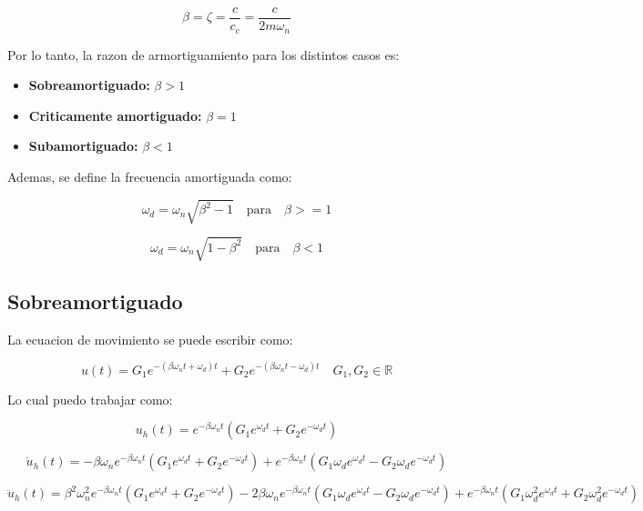 \documentclass{article}  %
\begin{document}
\begin{equation}
    \beta = \zeta = \frac{c}{c_c} = \frac{c}{2m\omega_n}
\end{equation}

Por lo tanto, la razon de armortiguamiento para los distintos casos es:

\begin{itemize}
    \item \textbf{Sobreamortiguado:} $\beta > 1$
    \item \textbf{Criticamente amortiguado:} $\beta = 1$
    \item \textbf{Subamortiguado:} $\beta < 1$
\end{itemize}

Ademas, se define la frecuencia amortiguada como:

\begin{equation}
    \omega_d = \omega_n \sqrt{\beta^2 - 1} \quad \text{para} \quad \beta >= 1
\end{equation}

\begin{equation}
    \omega_d = \omega_n \sqrt{1 - \beta^2} \quad \text{para} \quad \beta < 1
\end{equation}
\subsection{Sobreamortiguado}

La ecuacion de movimiento se puede escribir como:

\begin{equation}
    u(t) = G_1 e^{-(\beta \omega_n t + \omega_d)t} + G_2 e^{-(\beta \omega_n t - \omega_d)t} \quad G_1, G_2 \in \mathbb{R}
\end{equation}

Lo cual puedo trabajar como:

\begin{equation}
    u_h(t) = e^{-\beta \omega_n t} (G_1 e^{\omega_d t} + G_2 e^{-\omega_d t}) 
\end{equation}

\begin{equation}
    \dot{u}_h(t) = -\beta \omega_n e^{-\beta \omega_n t} (G_1 e^{\omega_d t} + G_2 e^{-\omega_d t}) + e^{-\beta \omega_n t} (G_1 \omega_d e^{\omega_d t} - G_2 \omega_d e^{-\omega_d t})
\end{equation}

\begin{equation}
    \ddot{u}_h(t) = \beta^2 \omega_n^2 e^{-\beta \omega_n t} (G_1 e^{\omega_d t} + G_2 e^{-\omega_d t}) - 2\beta \omega_n e^{-\beta \omega_n t} (G_1 \omega_d e^{\omega_d t} - G_2 \omega_d e^{-\omega_d t}) + e^{-\beta \omega_n t} (G_1 \omega_d^2 e^{\omega_d t} + G_2 \omega_d^2 e^{-\omega_d t})
\end{equation}
\end{document}
